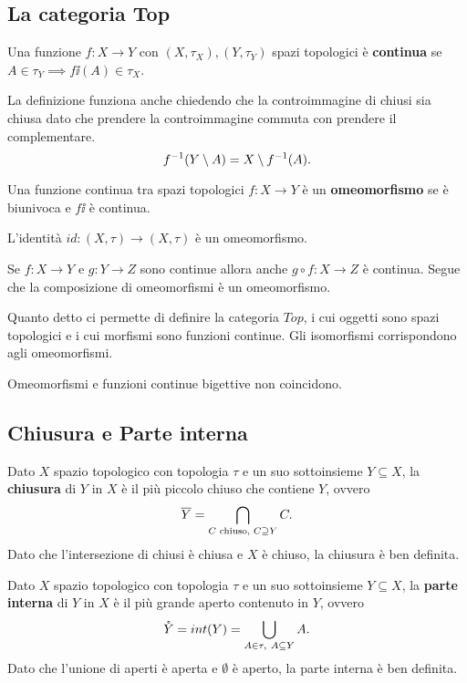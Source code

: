 \begin{multicols*}{2}
\subsection{La categoria Top}

\begin{definition}
Una funzione $f:X\to Y$ con $(X,\tau_X),(Y,\tau_Y)$ spazi topologici è \textbf{continua} se $A\in \tau_Y\implies f\ii(A)\in \tau_X$.
\end{definition}
\begin{remark}
La definizione funziona anche chiedendo che la controimmagine di chiusi sia chiusa dato che prendere la controimmagine commuta con prendere il complementare.
\[f^{-1}(Y\setminus A)=X\setminus f^{-1}(A).\]
\end{remark}
\begin{definition}[Omeomorfismo]
Una funzione continua tra spazi topologici $f:X\to Y$ è un \textbf{omeomorfismo} se è biunivoca e $f\ii$ è continua.
\end{definition}

\begin{remark}
L'identità $id:(X,\tau)\to (X,\tau)$ è un omeomorfismo.
\end{remark}
\begin{remark}
Se $f:X\to Y$ e $g:Y\to Z$ sono continue allora anche $g\circ f: X\to Z$ è continua. Segue che la composizione di omeomorfismi è un omeomorfismo.
\end{remark}
\begin{remark}
Quanto detto ci permette di definire la categoria $Top$, i cui oggetti sono spazi topologici e i cui morfismi sono funzioni continue. Gli isomorfismi corrispondono agli omeomorfismi.
\end{remark}

\begin{remark}
Omeomorfismi e funzioni continue bigettive non coincidono.
\end{remark}

\subsection{Chiusura e Parte interna}
\begin{definition}[Chiusura]
Dato $X$ spazio topologico con topologia $\tau$ e un suo sottoinsieme $Y\subseteq X$, la \textbf{chiusura} di $Y$ in $X$ è il più piccolo chiuso che contiene $Y$, ovvero
\[\overline{Y}=\bigcap_{C\text{ chiuso, }C\supseteq Y}C.\]
Dato che l'intersezione di chiusi è chiusa e $X$ è chiuso, la chiusura è ben definita.
\end{definition}
\begin{definition}
Dato $X$ spazio topologico con topologia $\tau$ e un suo sottoinsieme $Y\subseteq X$, la \textbf{parte interna} di $Y$ in $X$ è il più grande aperto contenuto in $Y$, ovvero
\[\rg Y=int(Y)=\bigcup_{A\in\tau,\ A\subseteq Y}A.\]
Dato che l'unione di aperti è aperta e $\emptyset$ è aperto, la parte interna è ben definita.
\end{definition}


\end{multicols*}
